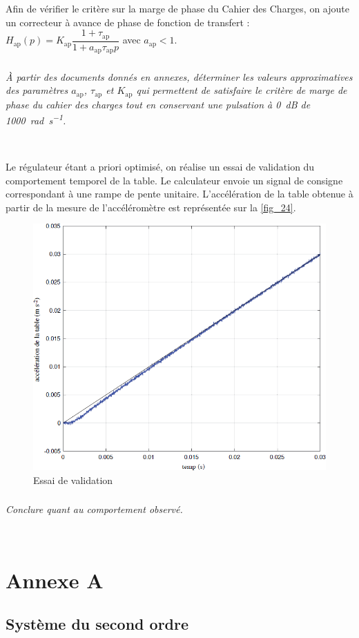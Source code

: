 \documentclass[10pt,fleqn]{article} %
\begin{document}
Afin de vérifier le critère sur la marge de phase du Cahier des Charges, on ajoute un correcteur à avance de
phase de fonction de transfert : $H_{\text{ap}}(p) = K_{\text{ap}}\dfrac{1+\tau_{\text{ap}}}{1+a_{\text{ap}}\tau_{\text{ap}}p}$ avec $a_{\text{ap}}<1$.

\subparagraph{\label{q_46}}\textit{À partir des documents donnés en annexes, déterminer les valeurs approximatives des paramètres $a_{\text{ap}}$, $\tau_{\text{ap}}$ et $K_{\text{ap}}$ qui permettent de satisfaire le critère de marge de phase du cahier
des charges tout en conservant une pulsation à \SI{0}{dB} de \SI{1 000}{rad.s^{-1}}.}
\ifprof
\begin{corrige} ~\\

\end{corrige}
\else
\fi

Le régulateur étant a priori optimisé, on réalise un essai de validation du comportement temporel de la
table. Le calculateur envoie un signal de consigne correspondant à une rampe de pente unitaire. L’accélération
de la table obtenue à partir de la mesure de l’accéléromètre est représentée sur la \autoref{fig_24}.

\begin{figure}[H]
\centering
\includegraphics[width=0.5\linewidth]{fig_24}
\caption{Essai de validation \label{fig_24}}
\end{figure}

\subparagraph{\label{q_47}}\textit{Conclure quant au comportement observé.}
\ifprof
\begin{corrige} ~\\

\end{corrige}
\else
\fi

\section{Annexe A}
\subsection{Système du second ordre}
\end{document}
